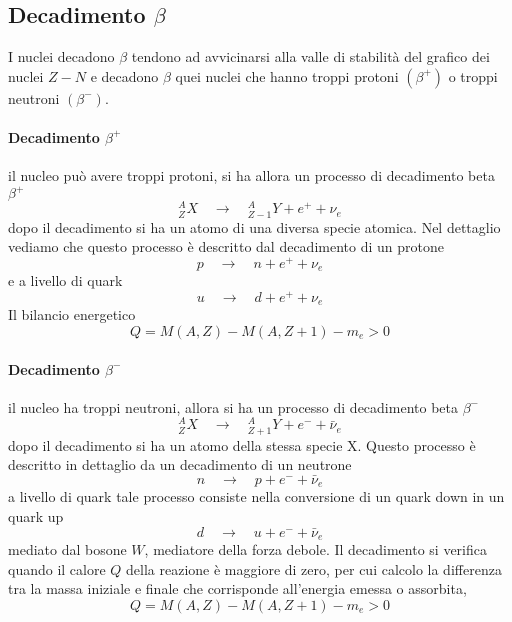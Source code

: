 \subsection{Decadimento $\beta$}
I nuclei decadono $\beta$ tendono ad avvicinarsi alla valle di stabilità del grafico dei nuclei $Z-N$ e decadono $\beta$ quei nuclei che hanno troppi protoni $(\beta^+)$ o troppi neutroni $(\beta^-)$.


\paragraph{Decadimento $\beta^+$} il nucleo può avere troppi protoni, si ha allora un processo di decadimento beta $\beta^+$
\begin{equation}
^{A}_{Z}X \quad\longrightarrow\quad ^{A}_{Z-1}Y + e^+ + \nu_e
\end{equation}
dopo il decadimento si ha un atomo di una diversa specie atomica.
Nel dettaglio vediamo che questo processo è descritto dal decadimento di un protone
\begin{equation}
p \quad\longrightarrow\quad n + e^+ + \nu_e
\end{equation}
e a livello di quark 
\begin{equation}
u \quad\longrightarrow\quad d + e^+ + \nu_e
\end{equation}
Il bilancio energetico 
\begin{equation}
Q = M(A,Z) - M(A,Z+1) - m_e > 0
\end{equation}


\paragraph{Decadimento $\beta^-$}  il nucleo ha troppi neutroni, allora si ha un processo di decadimento beta $\beta^-$
\begin{equation}
^{A}_{Z}X \quad\longrightarrow\quad  ^{A}_{Z+1}Y + e^- + \bar\nu_e
\end{equation}
dopo il decadimento si ha un atomo della stessa specie X.
Questo processo è descritto in dettaglio da un decadimento di un neutrone
\begin{equation}
n \quad\longrightarrow\quad p + e^- + \bar\nu_e
\end{equation}
a livello di quark tale processo consiste nella conversione di un quark down in un quark up
\begin{equation}
d \quad\longrightarrow\quad u + e^- + \bar\nu_e
\end{equation}
mediato dal bosone $W$, mediatore della forza debole.
Il decadimento si verifica quando il calore $Q$ della reazione è maggiore di zero, per cui calcolo la differenza tra la massa iniziale e finale che corrisponde all'energia emessa o assorbita,
\begin{equation}
Q = M(A,Z) - M(A,Z+1) - m_e > 0
\end{equation}

















